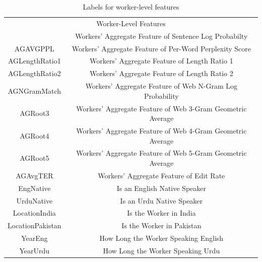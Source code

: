  \begin{table}[h]
 \center
\begin{tabular}{cc}
\hline
\multicolumn{2}{c}{Worker-Level Features}                                                          \\ \hhline{==}
\multicolumn{1}{c|}{AGLOGPROB}        & Workers' Aggregate Feature of Sentence Log Probabilty      \\ \hline
\multicolumn{1}{c|}{AGAVGPPL}         & Workers' Aggregate Feature of Per-Word Perplexity Score    \\ \hline
\multicolumn{1}{c|}{AGLengthRatio1}   & Workers' Aggregate Feature of Length Ratio 1               \\ \hline
\multicolumn{1}{c|}{AGLengthRatio2}   & Workers' Aggregate Feature of Length Ratio 2               \\ \hline
\multicolumn{1}{c|}{AGNGramMatch}     & Workers' Aggregate Feature of Web N-Gram Log Probability   \\ \hline
\multicolumn{1}{c|}{AGRoot3}          & Workers' Aggregate Feature of Web 3-Gram Geometric Average \\ \hline
\multicolumn{1}{c|}{AGRoot4}          & Workers' Aggregate Feature of Web 4-Gram Geometric Average \\ \hline
\multicolumn{1}{c|}{AGRoot5}          & Workers' Aggregate Feature of Web 5-Gram Geometric Average \\ \hline
\multicolumn{1}{c|}{AGAvgTER}         & Workers' Aggregate Feature of Edit Rate                    \\ \hline
\multicolumn{1}{c|}{EngNative}        & Is an English Native Speaker                               \\ \hline
\multicolumn{1}{c|}{UrduNative}       & Is an Urdu Native Speaker                                  \\ \hline
\multicolumn{1}{c|}{LocationIndia}    & Is the Worker in India                                     \\ \hline
\multicolumn{1}{c|}{LocationPakistan} & Is the Worker in Pakistan                                  \\ \hline
\multicolumn{1}{c|}{YearEng}          & How Long the Worker Speaking English                       \\ \hline
\multicolumn{1}{c|}{YearUrdu}         & How Long the Worker Speaking Urdu                          \\ \hline
\end{tabular}
\label{workerfeatures}
\caption{Labels for worker-level features}
\end{table}

